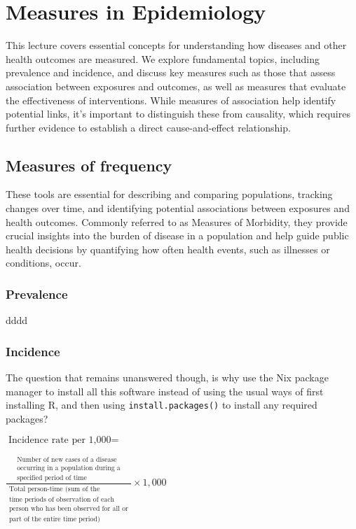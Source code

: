 \documentclass[
  letterpaper,
  paper=6in:9in,
  pagesize=pdftex,
  headinclude=on,
  footinclude=on,
  12pt]{scrbook}
\begin{document}
\chapter{Measures in Epidemiology}\label{sec-measure-in-epi}

This lecture covers essential concepts for understanding how diseases
and other health outcomes are measured. We explore fundamental topics,
including prevalence and incidence, and discuss key measures such as
those that assess association between exposures and outcomes, as well as
measures that evaluate the effectiveness of interventions. While
measures of association help identify potential links, it's important to
distinguish these from causality, which requires further evidence to
establish a direct cause-and-effect relationship.

\section{Measures of frequency}\label{measures-of-frequency}

These tools are essential for describing and comparing populations,
tracking changes over time, and identifying potential associations
between exposures and health outcomes. Commonly referred to as Measures
of Morbidity, they provide crucial insights into the burden of disease
in a population and help guide public health decisions by quantifying
how often health events, such as illnesses or conditions, occur.

\subsection{Prevalence}\label{prevalence}

dddd

\subsection{Incidence}\label{incidence}

The question that remains unanswered though, is why use the Nix package
manager to install all this software instead of using the usual ways of
first installing R, and then using \texttt{install.packages()} to
install any required packages?

\(\text{Incidence rate per 1,000} =\)

\(\frac{
\begin{aligned}
    \text{Number of new cases of a disease} \\
    \text{occurring in a population during a} \\
    \text{specified period of time}
\end{aligned}
}{
\begin{aligned}
    \text{Total person-time (sum of the} \\
    \text{time periods of observation of each} \\
    \text{person who has been observed for all or} \\
    \text{part of the entire time period)}
\end{aligned}
} \times 1,000\)
\end{document}
